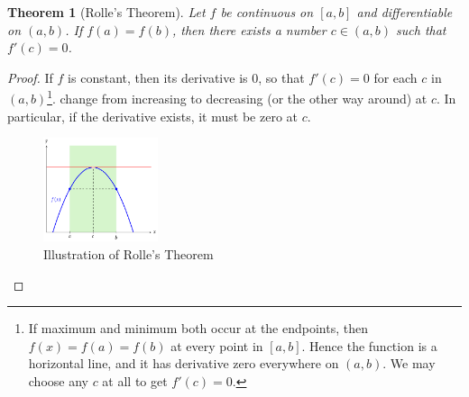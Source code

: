 \documentclass[a4paper]{amsproc}
\theoremstyle{plain}
\newtheorem{thm}{Theorem}[section]
\numberwithin{equation}{section} %
\numberwithin{figure}{section} %
\theoremstyle{plain}
\theoremstyle{definition}
\theoremstyle{definition}
\theoremstyle{remark}
\begin{document}
\begin{thm}[Rolle's Theorem]\label{thm:rolle}
Let $f$ be continuous on $[a, b]$ and differentiable on $(a, b)$. If $f(a) = f(b)$, then there exists a number
$c \in (a, b)$ such that $f'(c) = 0$.
\end{thm}

\begin{proof}
If $f$ is constant, then its derivative is $0$, so that $f'(c)=0$ for each $c$ in $(a,b)$\footnote{If maximum and minimum both occur at the endpoints, then
$f(x)=f(a)=f(b)$ at every point in $[a,b]$. Hence the function is a horizontal line, and it has derivative zero everywhere on $(a,b)$. We may choose any $c$ at all to get $f'(c)=0$.}.
change from increasing to decreasing (or the other way around) at $c$. In particular, if the derivative exists, it must be zero at $c$.
\begin{figure}[htb!]
\centering
\includegraphics[width=0.3\textwidth]{Rollee}
\caption{Illustration of Rolle's Theorem}
\label{fig:rolle}
\end{figure}


\end{proof}
\end{document}

